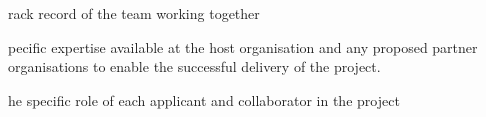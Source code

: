 \documentclass[a4paper,11point]{article}
\def\ii#1\par{{\color{blue!40}\sl #1}\par}
\def\iitem#1\par{\ii\begin{itemize}[nosep]\item #1 \end{itemize}\par}
\begin{document}
\iitem Track record of the team working together  

\iitem Specific expertise available at the host organisation and any 
proposed partner organisations to enable the successful delivery of 
the project.  

\iitem The specific role of each applicant and collaborator in the project




\end{document}
